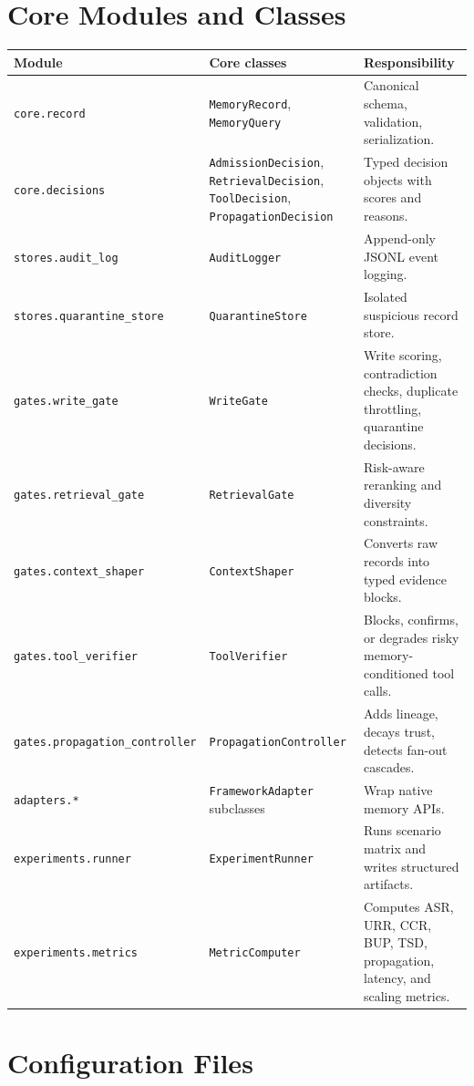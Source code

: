 \documentclass[11pt,oneside]{report}
\begin{document}
\section{Core Modules and Classes}

\begin{longtable}{|L{0.25\textwidth}|L{0.30\textwidth}|L{0.35\textwidth}|}
\hline
\textbf{Module} & \textbf{Core classes} & \textbf{Responsibility} \\
\hline
\texttt{core.record} & \texttt{MemoryRecord}, \texttt{MemoryQuery} & Canonical schema,
validation, serialization. \\
\hline
\texttt{core.decisions} & \texttt{AdmissionDecision}, \texttt{RetrievalDecision},
\texttt{ToolDecision}, \texttt{PropagationDecision} & Typed decision objects with scores and
reasons. \\
\hline
\texttt{stores.audit\_log} & \texttt{AuditLogger} & Append-only JSONL event logging. \\
\hline
\texttt{stores.quarantine\_store} & \texttt{QuarantineStore} & Isolated suspicious record store. \\
\hline
\texttt{gates.write\_gate} & \texttt{WriteGate} & Write scoring, contradiction checks, duplicate
throttling, quarantine decisions. \\
\hline
\texttt{gates.retrieval\_gate} & \texttt{RetrievalGate} & Risk-aware reranking and diversity
constraints. \\
\hline
\texttt{gates.context\_shaper} & \texttt{ContextShaper} & Converts raw records into typed evidence
blocks. \\
\hline
\texttt{gates.tool\_verifier} & \texttt{ToolVerifier} & Blocks, confirms, or degrades risky
memory-conditioned tool calls. \\
\hline
\texttt{gates.propagation\_controller} & \texttt{PropagationController} & Adds lineage, decays
trust, detects fan-out cascades. \\
\hline
\texttt{adapters.*} & \texttt{FrameworkAdapter} subclasses & Wrap native memory APIs. \\
\hline
\texttt{experiments.runner} & \texttt{ExperimentRunner} & Runs scenario matrix and writes
structured artifacts. \\
\hline
\texttt{experiments.metrics} & \texttt{MetricComputer} & Computes ASR, URR, CCR, BUP, TSD,
propagation, latency, and scaling metrics. \\
\hline
\end{longtable}

\section{Configuration Files}
\end{document}
